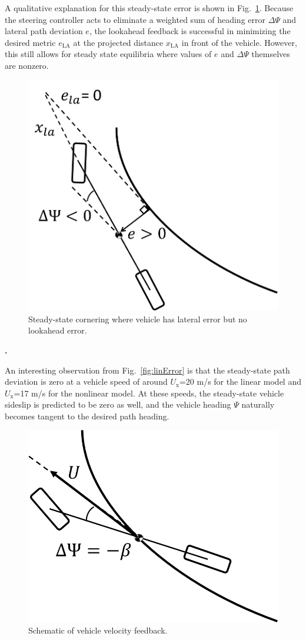\documentclass[10pt,a4paper]{article}
\def\section#1{\refstepcounter{section} \vspace{3.5mm} \noindent
{\normalsize\bf {\thesection.}} \hspace{0.5mm}{\normalsize\bf #1} \par \vspace{2mm}}
\begin{document}
A qualitative explanation for this steady-state error is shown in Fig.~\ref{fig:SSerror}. Because the steering controller acts to eliminate a weighted
sum of heading error $\Delta\Psi$ and lateral path deviation $e$, the lookahead feedback is successful in
minimizing the desired metric $e_\mathrm{LA}$ at the projected distance $x_\mathrm{LA}$ in front of the vehicle. However, this still allows for steady state equilibria where
values of $e$ and $\Delta\Psi$ themselves are nonzero.  


\begin{figure}[h]
\centering
\includegraphics[width=0.6\columnwidth]{figures/SSerror.png}
\caption{Steady-state cornering where vehicle has lateral error but no lookahead error.  }
\label{fig:SSerror}
\end{figure}

\vspace{6 mm}





\section{VELOCITY VECTOR FEEDBACK}
\label{sec:vvfb}

An interesting observation from Fig.~\ref{fig:linError} is that the steady-state path deviation
 is zero at a vehicle speed of around $U_\mathrm{x}$=20 m/s for the linear model and $U_\mathrm{x}$=17 m/s for the nonlinear model. 
 At these speeds, the steady-state vehicle sideslip is predicted to be zero as well, 
and the vehicle heading $\Psi$ naturally becomes tangent to the desired path heading. 
\begin{figure}[h]
\centering
\includegraphics[width=0.5\columnwidth]{figures/LookaheadWithSideslip.png}
\caption{Schematic of vehicle velocity feedback.}
\label{fig:lawithsideslip}
\end{figure}
\end{document}
